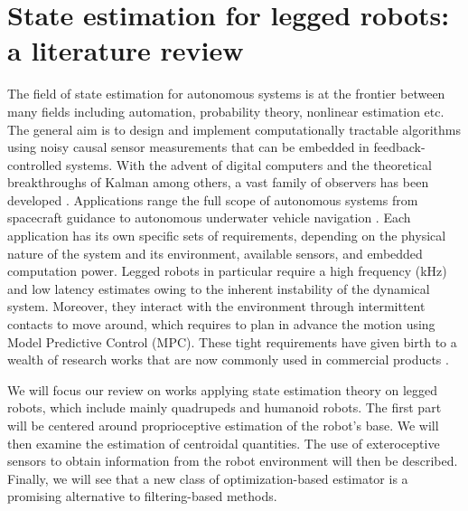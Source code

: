 \chapter{State estimation for legged robots: a literature review}
%
The field of state estimation for autonomous systems is at the frontier between many fields including automation, probability theory, nonlinear estimation etc.
The general aim is to design and implement computationally tractable algorithms using noisy causal sensor measurements that can be embedded in feedback-controlled systems.
With the advent of digital computers and the theoretical breakthroughs of Kalman \cite{kalman1960new} among others, a vast family of observers has been developed 
\cite{smith1962application, bellantoni1967square, wan2001unscented, thrun2004simultaneous}. Applications range the full scope of autonomous systems from spacecraft guidance \cite{mcgee1985discovery} 
to autonomous underwater vehicle navigation \cite{leonard2016autonomous}. Each application has its own specific sets of requirements, depending on the physical
nature of the system and its environment, available sensors, and embedded computation power. Legged robots in particular require a high frequency (kHz) 
and low latency estimates owing to the inherent instability of the dynamical system. Moreover, they interact with the environment through 
intermittent contacts to move around, which requires to plan in advance the motion using Model Predictive Control (MPC). These tight requirements 
have given birth to a wealth of research works that are now commonly used in commercial products \cite{hutter2016anymal}.

We will focus our review on works applying state estimation theory on legged robots, which include mainly quadrupeds and humanoid robots. The first part will 
be centered around proprioceptive estimation of the robot's base. We will then examine the estimation of centroidal quantities. The use of exteroceptive sensors
to obtain information from the robot environment will then be described. Finally, we will see that a new class of optimization-based estimator is a promising alternative
to filtering-based methods.

